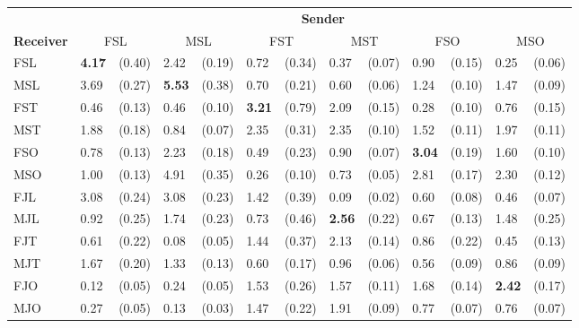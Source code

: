 
\begin{tabular}{ll@{\,\,\,}rl@{\,\,\,}rl@{\,\,\,}rl@{\,\,\,}rl@{\,\,\,}rl@{\,\,\,}r}
\toprule
    & \multicolumn{12}{c}{\textbf{Sender}} \\
    \cmidrule(lr){2- 13 }
\textbf{Receiver}
    & \multicolumn{2}{c}{\textnormal{FSL}}
    & \multicolumn{2}{c}{\textnormal{MSL}}
    & \multicolumn{2}{c}{\textnormal{FST}}
    & \multicolumn{2}{c}{\textnormal{MST}}
    & \multicolumn{2}{c}{\textnormal{FSO}}
    & \multicolumn{2}{c}{\textnormal{MSO}} \\
    \cmidrule(lr){1-1}
    \cmidrule(lr){2-3}
    \cmidrule(lr){4-5}
    \cmidrule(lr){6-7}
    \cmidrule(lr){8-9}
    \cmidrule(lr){10-11}
    \cmidrule(lr){12-13}
    \textnormal{FSL} & \textbf{4.17} & (0.40) & 2.42 & (0.19) & 0.72 & (0.34) & 0.37 & (0.07) & 0.90 & (0.15) & 0.25 & (0.06) \\
    \textnormal{MSL} & 3.69 & (0.27) & \textbf{5.53} & (0.38) & 0.70 & (0.21) & 0.60 & (0.06) & 1.24 & (0.10) & 1.47 & (0.09) \\
    \textnormal{FST} & 0.46 & (0.13) & 0.46 & (0.10) & \textbf{3.21} & (0.79) & 2.09 & (0.15) & 0.28 & (0.10) & 0.76 & (0.15) \\
    \textnormal{MST} & 1.88 & (0.18) & 0.84 & (0.07) & 2.35 & (0.31) & 2.35 & (0.10) & 1.52 & (0.11) & 1.97 & (0.11) \\
    \textnormal{FSO} & 0.78 & (0.13) & 2.23 & (0.18) & 0.49 & (0.23) & 0.90 & (0.07) & \textbf{3.04} & (0.19) & 1.60 & (0.10) \\
    \textnormal{MSO} & 1.00 & (0.13) & 4.91 & (0.35) & 0.26 & (0.10) & 0.73 & (0.05) & 2.81 & (0.17) & 2.30 & (0.12) \\
    \textnormal{FJL} & 3.08 & (0.24) & 3.08 & (0.23) & 1.42 & (0.39) & 0.09 & (0.02) & 0.60 & (0.08) & 0.46 & (0.07) \\
    \textnormal{MJL} & 0.92 & (0.25) & 1.74 & (0.23) & 0.73 & (0.46) & \textbf{2.56} & (0.22) & 0.67 & (0.13) & 1.48 & (0.25) \\
    \textnormal{FJT} & 0.61 & (0.22) & 0.08 & (0.05) & 1.44 & (0.37) & 2.13 & (0.14) & 0.86 & (0.22) & 0.45 & (0.13) \\
    \textnormal{MJT} & 1.67 & (0.20) & 1.33 & (0.13) & 0.60 & (0.17) & 0.96 & (0.06) & 0.56 & (0.09) & 0.86 & (0.09) \\
    \textnormal{FJO} & 0.12 & (0.05) & 0.24 & (0.05) & 1.53 & (0.26) & 1.57 & (0.11) & 1.68 & (0.14) & \textbf{2.42} & (0.17) \\
    \textnormal{MJO} & 0.27 & (0.05) & 0.13 & (0.03) & 1.47 & (0.22) & 1.91 & (0.09) & 0.77 & (0.07) & 0.76 & (0.07) \\
\end{tabular}

